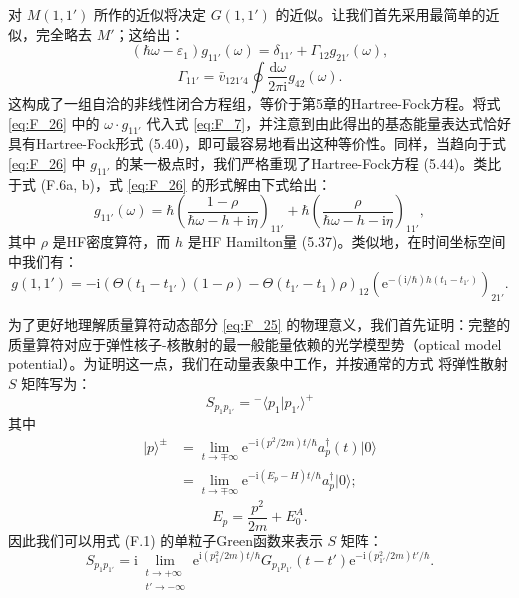 对 $M(1,1')$ 所作的近似将决定 $G(1,1')$ 的近似。让我们首先采用最简单的近似，完全略去 $M'$；这给出：
\begin{equation}
(\hbar\omega-\varepsilon_{1})g_{11'}(\omega)=\delta_{11'}+\Gamma_{12}g_{21'}(\omega),\label{eq:F_26}
\end{equation}
\begin{equation}
\Gamma_{11'}=\bar{v}_{121'4}\oint\frac{\mathrm{d}\omega}{2\pi\mathrm{i}}g_{42}(\omega).\label{eq:F_27}
\end{equation}
这构成了一组自洽的非线性闭合方程组，等价于第5章的Hartree-Fock方程。将式 \ref{eq:F_26} 中的 $\omega\cdot g_{11'}$
代入式 \ref{eq:F_7}，并注意到由此得出的基态能量表达式恰好具有Hartree-Fock形式 (5.40)，即可最容易地看出这种等价性。同样，当趋向于式
\ref{eq:F_26} 中 $g_{11'}$ 的某一极点时，我们严格重现了Hartree-Fock方程 (5.44)。类比于式
(F.6a, b)，式 \ref{eq:F_26} 的形式解由下式给出：
\begin{equation}
g_{11'}(\omega)=\hbar\left(\frac{1-\rho}{\hbar\omega-h+\mathrm{i}\eta}\right)_{11'}+\hbar\left(\frac{\rho}{\hbar\omega-h-\mathrm{i}\eta}\right)_{11'},\label{eq:F_28}
\end{equation}
其中 $\rho$ 是HF密度算符，而 $h$ 是HF Hamilton量 (5.37)。类似地，在时间坐标空间中我们有：
\begin{equation}
g(1,1')=-\mathrm{i}\left(\Theta(t_{1}-t_{1'})(1-\rho)-\Theta(t_{1'}-t_{1})\rho\right)_{12}\left(\mathrm{e}^{-(\mathrm{i}/\hbar)h(t_{1}-t_{1'})}\right)_{21'}.\label{eq:F_29}
\end{equation}

为了更好地理解质量算符动态部分 \ref{eq:F_25} 的物理意义，我们首先证明：完整的质量算符对应于弹性核子-核散射的最一般能量依赖的光学模型势（optical
model potential）。为证明这一点，我们在动量表象中工作，并按通常的方式 \cite{ES69} 将弹性散射 $S$
矩阵写为：
\begin{equation}
S_{p_{1}p_{1'}}={}^{-}\langle p_{1}|p_{1'}\rangle^{+}\label{eq:F_30}
\end{equation}
其中
\begin{align}
|p\rangle^{\pm} & =\lim_{t\rightarrow\mp\infty}\mathrm{e}^{-\mathrm{i}(p^{2}/2m)t/\hbar}a^{\dagger}_{p}(t)|0\rangle\nonumber \\
 & =\lim_{t\rightarrow\mp\infty}\mathrm{e}^{-\mathrm{i}(E_{p}-H)t/\hbar}a^{\dagger}_{p}|0\rangle;\label{eq:F_31}
\end{align}
\[
E_{p}=\frac{p^{2}}{2m}+E^{A}_{0}.
\]
因此我们可以用式 (F.1) 的单粒子Green函数来表示 $S$ 矩阵：
\begin{equation}
S_{p_{1}p_{1'}}=\mathrm{i}\lim_{\substack{t\rightarrow+\infty\\
t'\rightarrow-\infty
}
}\mathrm{e}^{\mathrm{i}(p^{2}_{1}/2m)t/\hbar}G_{p_{1}p_{1'}}(t-t')\mathrm{e}^{-\mathrm{i}(p^{2}_{1'}/2m)t'/\hbar}.\label{eq:F_32}
\end{equation}


